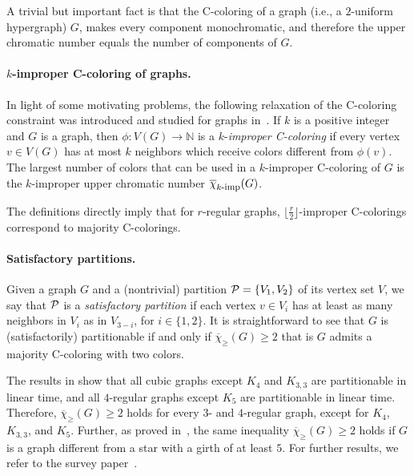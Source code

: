 \documentclass{article}
\theoremstyle{definition}
\newcommand{\mc}{\overline{\chi}_{\geqslant}}
\newcommand{\cP}{{\cal P}}
\begin{document}
A trivial but important fact is that the C-coloring of a graph (i.e., a $2$-uniform hypergraph) $G$, makes every component monochromatic, and therefore the upper chromatic number equals the number of components of $G$. 

\paragraph{$k$-improper C-coloring of graphs.} 
In light of some motivating problems, the following relaxation of the C-coloring constraint was introduced and studied for graphs in~\cite{BuSaTuPuVa-10}. If $k$ is a positive integer and $G$ is a graph, then  $\phi \colon  V(G) \rightarrow \mathbb{N}$ is a $k$-{\it improper C-coloring} if every vertex $v \in V(G)$ has at most $k$ neighbors which receive colors different from $\phi(v)$.  The largest number of colors that can be used in a $k$-improper C-coloring of $G$ is the $k$-improper upper chromatic number $\overline{\chi}_{k\mbox{\footnotesize{-imp}}}(G)$. 

The definitions directly imply that for $r$-regular graphs, $\lfloor \frac{r}{2} \rfloor$-improper C-colorings correspond to majority C-colorings.

\paragraph{Satisfactory partitions.} 
Given a graph $G$ and a (nontrivial) partition $\cP=\{V_1, V_2\}$ of its vertex set $V$, we say that $\cP$ is a {\it satisfactory partition} if each vertex $v \in V_i$ has at least as many neighbors in $V_i$ as in $V_{3-i}$, for $i \in \{1,2\}$. It is straightforward to see that $G$ is (satisfactorily) partitionable if and only if $\mc(G) \ge 2$ that is $G$ admits a majority C-coloring with two colors.


The results in \cite{BTV-2003, GeKob-2000, Moshi, Shaf} show that all cubic graphs except $K_4$ and $K_{3,3}$ are
partitionable in linear time, and all $4$-regular graphs except $K_5$ are partitionable in linear time. Therefore, $\mc(G) \ge 2$ holds for every $3$- and $4$-regular graph, except for $K_4$, $K_{3,3}$, and $K_5$. Further, as proved in~\cite{GeKob-2004}, the same inequality $\mc(G) \ge 2$ holds if $G$ is a graph different from a star with a girth of at least $5$. For further results, we refer to the survey paper~\cite{BTV-06}.
\end{document}
